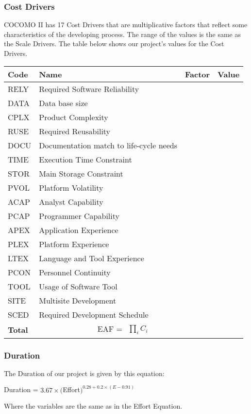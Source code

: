 	\vspace{2em}

\subsubsection{Cost Drivers}

COCOMO II has 17 Cost Drivers that are multiplicative factors that reflect some characteristics of the developing process. 
The range of the values is the same as the Scale Drivers.
The table below shows our project's values for the Cost Drivers.\\ 
	
	\begin{tabular}{|l|l|l|l|}
	\hline
	\textbf{Code} & \textbf{Name} & \textbf{Factor} & \textbf{Value}\\
	\hline
	RELY & Required Software Reliability & &\\
	\hline
	DATA & Data base size & &\\
	\hline
	CPLX & Product Complexity & & \\
	\hline
	RUSE& Required Reusability & & \\
	\hline
	DOCU & Documentation match to life-cycle needs & & \\
	\hline
	TIME & Execution Time Constraint & &\\
	\hline
	STOR & Main Storage Constraint & &\\
	\hline
	PVOL & Platform Volatility & & \\
	\hline
	ACAP & Analyst Capability & & \\
	\hline
	PCAP & Programmer Capability & & \\
	\hline
	APEX & Application Experience & &\\
	\hline
	PLEX & Platform Experience & &\\
	\hline
	LTEX & Language and Tool Experience & & \\
	\hline
	PCON & Personnel Continuity & & \\
	\hline
	TOOL & Usage of Software Tool & & \\
	\hline
	SITE & Multisite Development & &\\
	\hline
	SCED & Required Development Schedule & &\\
	\hline
	\textbf{Total} & \multicolumn{2}{|c|}{EAF = $\begin{matrix} \prod_{i} C_i \end{matrix}$} & \\
	\hline
	\end{tabular}
	
\subsubsection{Duration}
	The Duration of our project is given by this equation:\\
	\begin{center}
	
	Duration = $ 3.67 \times  ($Effort$)^{0.28 + 0.2 \times (E-0.91)} $ \\
	
	\end{center}
	
	Where the variables are the same as in the Effort Equation.\\
	
	